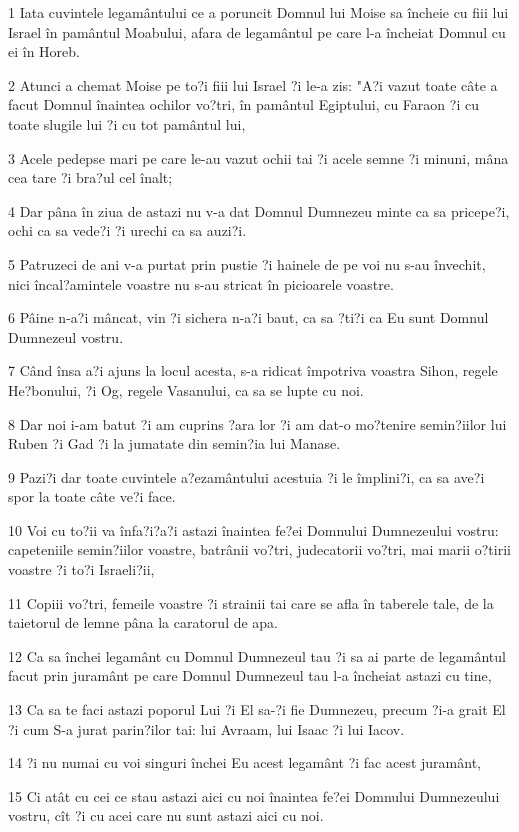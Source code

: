 \par 1 Iata cuvintele legamântului ce a poruncit Domnul lui Moise sa încheie cu fiii lui Israel în pamântul Moabului, afara de legamântul pe care l-a încheiat Domnul cu ei în Horeb.
\par 2 Atunci a chemat Moise pe to?i fiii lui Israel ?i le-a zis: "A?i vazut toate câte a facut Domnul înaintea ochilor vo?tri, în pamântul Egiptului, cu Faraon ?i cu toate slugile lui ?i cu tot pamântul lui,
\par 3 Acele pedepse mari pe care le-au vazut ochii tai ?i acele semne ?i minuni, mâna cea tare ?i bra?ul cel înalt;
\par 4 Dar pâna în ziua de astazi nu v-a dat Domnul Dumnezeu minte ca sa pricepe?i, ochi ca sa vede?i ?i urechi ca sa auzi?i.
\par 5 Patruzeci de ani v-a purtat prin pustie ?i hainele de pe voi nu s-au învechit, nici încal?amintele voastre nu s-au stricat în picioarele voastre.
\par 6 Pâine n-a?i mâncat, vin ?i sichera n-a?i baut, ca sa ?ti?i ca Eu sunt Domnul Dumnezeul vostru.
\par 7 Când însa a?i ajuns la locul acesta, s-a ridicat împotriva voastra Sihon, regele He?bonului, ?i Og, regele Vasanului, ca sa se lupte cu noi.
\par 8 Dar noi i-am batut ?i am cuprins ?ara lor ?i am dat-o mo?tenire semin?iilor lui Ruben ?i Gad ?i la jumatate din semin?ia lui Manase.
\par 9 Pazi?i dar toate cuvintele a?ezamântului acestuia ?i le împlini?i, ca sa ave?i spor la toate câte ve?i face.
\par 10 Voi cu to?ii va înfa?i?a?i astazi înaintea fe?ei Domnului Dumnezeului vostru: capeteniile semin?iilor voastre, batrânii vo?tri, judecatorii vo?tri, mai marii o?tirii voastre ?i to?i Israeli?ii,
\par 11 Copiii vo?tri, femeile voastre ?i strainii tai care se afla în taberele tale, de la taietorul de lemne pâna la caratorul de apa.
\par 12 Ca sa închei legamânt cu Domnul Dumnezeul tau ?i sa ai parte de legamântul facut prin juramânt pe care Domnul Dumnezeul tau l-a încheiat astazi cu tine,
\par 13 Ca sa te faci astazi poporul Lui ?i El sa-?i fie Dumnezeu, precum ?i-a grait El ?i cum S-a jurat parin?ilor tai: lui Avraam, lui Isaac ?i lui Iacov.
\par 14 ?i nu numai cu voi singuri închei Eu acest legamânt ?i fac acest juramânt,
\par 15 Ci atât cu cei ce stau astazi aici cu noi înaintea fe?ei Domnului Dumnezeului vostru, cît ?i cu acei care nu sunt astazi aici cu noi.
